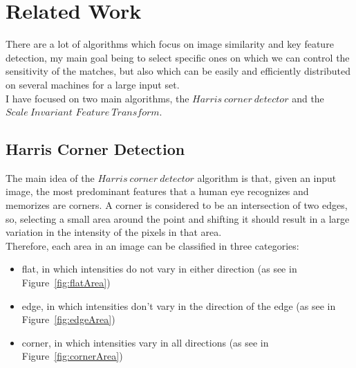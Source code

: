 \chapter{Related Work}

There are a lot of algorithms which focus on image similarity and key feature detection, my main goal being to select specific ones on which we can control the sensitivity of the matches, but also which can be easily and efficiently distributed on several machines for a large input set. \\
I have focused on two main algorithms, the $Harris\ corner\ detector$ and the $Scale\ Invariant$ $Feature\ Transform$.


\section{Harris Corner Detection}

The main idea of the $Harris\ corner\ detector$ algorithm is that, given an input image, the most predominant features that a human eye recognizes and memorizes are corners. A corner is considered to be an intersection of two edges, so, selecting a small area around the point and shifting it should result in a large variation in the intensity of the pixels in that area. \\
Therefore, each area in an image can be classified in three categories:
\begin{itemize}
	\item flat, in which intensities do not vary in either direction (as see in Figure~\ref{fig:flatArea})
	\item edge, in which intensities don't vary in the direction of the edge (as see in Figure~\ref{fig:edgeArea})
	\item corner, in which intensities vary in all directions (as see in Figure~\ref{fig:cornerArea})
\end{itemize}

